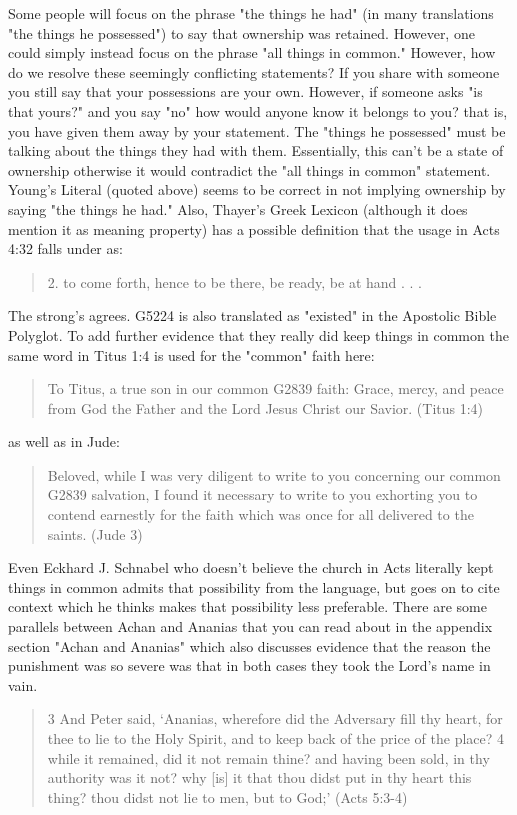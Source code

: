 \documentclass[11pt]{article}
\begin{document}
Some people will focus on the phrase "the things he had" (in many translations "the things he possessed") to say that ownership was retained. However, one could simply instead focus on the phrase "all things in common." However, how do we resolve these seemingly conflicting statements? If you share with someone you still say that your possessions are your own. However, if someone asks "is that yours?" and you say "no" how would anyone know it belongs to you? that is, you have given them away by your statement. The "things he possessed" must be talking about the things they had with them. Essentially, this can't be a state of ownership otherwise it would contradict the "all things in common" statement. 
Young's Literal (quoted above) seems to be correct in not implying ownership by saying "the things he had." Also, Thayer's Greek Lexicon (although it does mention it as meaning property) has a possible definition that the usage in Acts 4:32 falls under as:
\begin{quote}
2. to come forth, hence to be there, be ready, be at hand . . .
\end{quote}
The strong's agrees.\cite{possessions thayer's strong's} G5224 is also translated as "existed" in the Apostolic Bible Polyglot.\cite{G5224 apostolic bible polyglot} To add further evidence that they really did keep things in common the same word in Titus 1:4 is used for the "common" faith here: 
\begin{quote}
To Titus, a true son in our common G2839 faith: Grace, mercy, and peace from God the Father and the Lord Jesus Christ our Savior. (Titus 1:4)
\end{quote} as well as in Jude: 
\begin{quote}
Beloved, while I was very diligent to write to you concerning our common G2839 salvation, I found it necessary to write to you exhorting you to contend earnestly for the faith which was once for all delivered to the saints. (Jude 3)
\end{quote}
Even Eckhard J. Schnabel who doesn't believe the church in Acts literally kept things in common admits that possibility from the language, but goes on to cite context which he thinks makes that possibility less preferable.\cite{Essenes common property} There are some parallels between Achan and Ananias that you can read about in the appendix section "Achan and Ananias" which also discusses evidence that the reason the punishment was so severe was that in both cases they took the Lord's name in vain. 
\begin{quote}
3 And Peter said, `Ananias, wherefore did the Adversary fill thy heart, for thee to lie to the Holy Spirit, and to keep back of the price of the place?
4 while it remained, did it not remain thine? and having been sold, in thy authority was it not? why [is] it that thou didst put in thy heart this thing? thou didst not lie to men, but to God;' (Acts 5:3-4)
\end{quote}
\end{document}
